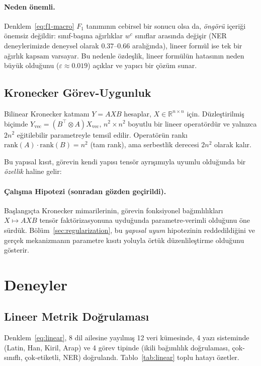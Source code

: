 \documentclass[11pt,a4paper]{article}
\begin{document}
\paragraph{Neden önemli.}
Denklem~\ref{eq:f1-macro} $F_1$ tanımının cebirsel bir sonucu olsa da,
\emph{öngörü} içeriği önemsiz değildir: sınıf-başına ağırlıklar $w^c$
sınıflar arasında değişir (NER deneylerimizde deneysel olarak
$0.37$--$0.66$ aralığında), lineer formül ise tek bir ağırlık
$\text{kapsam}$ varsayar. Bu nedenle özdeşlik, lineer formülün
hatasının neden büyük olduğunu ($\varepsilon \approx 0.019$)
açıklar ve yapıcı bir çözüm sunar.

\subsection{Kronecker Görev-Uygunluk}
\label{sec:kronecker}

Bilinear Kronecker katmanı $Y = A X B$ hesaplar, $X \in \mathbb{R}^{n \times n}$
için. Düzleştirilmiş biçimde $Y_{\text{vec}} = (B^\top \otimes A) X_{\text{vec}}$,
$n^2 \times n^2$ boyutlu bir lineer operatördür ve yalnızca $2n^2$
eğitilebilir parametreyle temsil edilir. Operatörün rankı
$\text{rank}(A) \cdot \text{rank}(B) = n^2$ (tam rank), ama serbestlik
derecesi $2n^2$ olarak kalır.

Bu yapısal kısıt, görevin kendi yapısı tensör ayrışımıyla uyumlu
olduğunda bir \emph{özellik} haline gelir:

\paragraph{Çalışma Hipotezi (sonradan gözden geçirildi).}
Başlangıçta Kronecker mimarilerinin, görevin fonksiyonel bağımlılıkları
$X \mapsto A X B$ tensör faktörizasyonuna uyduğunda parametre-verimli
olduğunu öne sürdük. Bölüm~\ref{sec:regularization}, bu
\emph{yapısal uyum} hipotezinin reddedildiğini ve gerçek mekanizmanın
parametre kısıtı yoluyla örtük düzenlileştirme olduğunu gösterir.


\section{Deneyler}
\label{sec:experiments}

\subsection{Lineer Metrik Doğrulaması}
\label{sec:exp-linear}

Denklem~\ref{eq:linear}, 8 dil ailesine yayılmış 12 veri kümesinde,
4 yazı sisteminde (Latin, Han, Kiril, Arap) ve 4 görev tipinde (ikili
bağımlılık doğrulaması, çok-sınıflı, çok-etiketli, NER) doğrulandı.
Tablo~\ref{tab:linear} toplu hatayı özetler.
\end{document}

